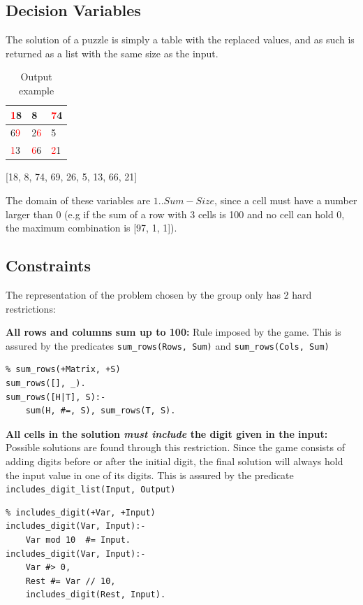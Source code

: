 \documentclass[runningheads]{llncs}
\newcommand{\red}[1]{\textcolor{red}{#1}}
\begin{document}
\subsection{Decision Variables}
The solution of a puzzle is simply a table with the replaced values, and as such is returned as a list with the same size as the input.
\begin{table}
    \caption{Output example}
    \centering
    \begin{tabular}{|p{1cm}|p{1cm}|p{1cm}|}
    \hline
    \red{1}8&8&\red{7}4\\[5pt]
    \hline
    6\red{9}&2\red{6}&5\\[5pt]
    \hline
    \red{1}3&\red{6}6&\red{2}1\\[5pt]
    \hline
    \end{tabular}
\end{table}
\begin{center}
    [18, 8, 74, 69, 26, 5, 13, 66, 21]
\end{center}

The domain of these variables are $1..Sum-Size$, since a cell must have a number larger than 0 (e.g if the sum of a row with 3 cells is 100 and no cell can hold 0, the maximum combination is [97, 1, 1]).

\subsection{Constraints}
The representation of the problem chosen by the group only has 2 hard restrictions:

\textbf{All rows and columns sum up to 100:} Rule imposed by the game. This is assured by the predicates \verb!sum_rows(Rows, Sum)! and \verb!sum_rows(Cols, Sum)!
\begin{verbatim}
% sum_rows(+Matrix, +S)
sum_rows([], _).
sum_rows([H|T], S):-
    sum(H, #=, S), sum_rows(T, S).
\end{verbatim}

\textbf{All cells in the solution \textit{must include} the digit given in the input:} Possible solutions are found through this restriction. Since the game consists of adding digits before or after the initial digit, the final solution will always hold the input value in one of its digits. This is assured by the predicate \verb!includes_digit_list(Input, Output)!
\begin{verbatim}
% includes_digit(+Var, +Input)
includes_digit(Var, Input):-
    Var mod 10  #= Input.
includes_digit(Var, Input):-
    Var #> 0,
    Rest #= Var // 10,
    includes_digit(Rest, Input).
\end{verbatim}
\end{document}
